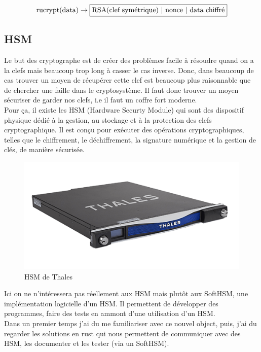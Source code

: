 \documentclass[a4paper, 12pt]{article}
\begin{document}
$$
\text{rucrypt(data)} \rightarrow \fbox{RSA(clef symétrique) | nonce | data chiffré}
$$

\subsection{HSM} \label{HSMsec}

Le but des cryptographe est de créer des problèmes facile à résoudre quand on a la clefs mais beaucoup trop long à casser le cas inverse. Donc, dans beaucoup de cas trouver un moyen de récupérer cette clef est beaucoup plus raisonnable que de chercher une faille dans le cryptosystème. Il faut donc trouver un moyen sécuriser de garder nos clefs, i.e il faut un coffre fort moderne. \\

Pour ça, il existe les HSM (Hardware Securty Module) qui sont des dispositif physique dédié à la gestion, au stockage et à la protection des clefs cryptographique. Il est conçu pour exécuter des opérations cryptographiques, telles que le chiffrement, le déchiffrement, la signature numérique et la gestion de clés, de manière sécurisée.


\begin{figure}[h]
	\centering
	\includegraphics[width=.7\textwidth]{img/hsm.png}
	\caption{HSM de Thales}
	\label{hsmthales}
\end{figure}

Ici on ne n'intéressera pas réellement aux HSM mais plutôt aux SoftHSM, une implémentation logicielle d'un HSM. Il permettent de développer des programmes, faire des tests en ammont d'une utilisation d'un HSM. \\

Dans un premier temps j'ai du me familiariser avec ce nouvel object, puis, j'ai du regarder les solutions en rust qui nous permettent de communiquer avec des HSM, les documenter et les tester (via un SoftHSM). \\
\end{document}
